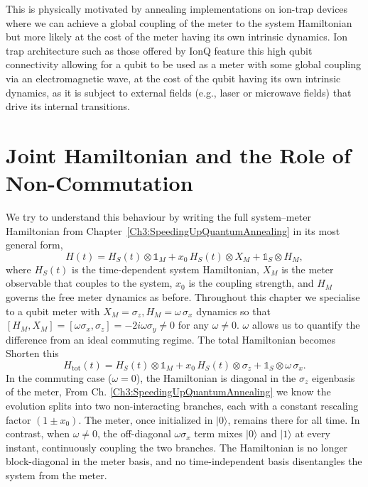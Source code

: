\qquad This is physically motivated by annealing implementations on ion-trap devices where we can achieve a global coupling of the meter to the system Hamiltonian but more likely at the cost of the meter having its own intrinsic dynamics. Ion trap architecture such as those offered by IonQ feature this high qubit connectivity allowing for a qubit to be used as a meter with some global coupling via an electromagnetic wave\cite{IONQArichitecture2019}, at the cost of the qubit having its own intrinsic dynamics, as it is subject to external fields (e.g., laser or microwave fields) that drive its internal transitions.

\section{Joint Hamiltonian and the Role of Non-Commutation}\label{sec:joint_hamiltonian}

\qquad We try to understand this behaviour by writing the full system--meter Hamiltonian from Chapter~\ref{Ch3:SpeedingUpQuantumAnnealing} in its most general form,
\begin{equation}\label{eq:total_hamiltonian_nc}
    H(t) = H_S(t) \otimes \mathds{1}_M + x_0\, H_S(t) \otimes X_M + \mathds{1}_S \otimes H_M,
\end{equation}
where $H_S(t)$ is the time-dependent system Hamiltonian, $X_M$ is the meter observable that couples to the system, $x_0$ is the coupling strength, and $H_M$ governs the free meter dynamics as before. Throughout this chapter we specialise to a qubit meter with $X_M = \sigma_z, H_M = \omega\,\sigma_x$ dynamics so that $[H_M, X_M] = [\omega\sigma_x, \sigma_z] = -2i\omega\sigma_y \neq 0$ for any $\omega \neq 0$. $\omega$ allows us to quantify the difference from an ideal commuting regime. The total Hamiltonian becomes \color{red} Shorten this \color{black}
\begin{equation}\label{eq:total_hamiltonian_explicit}
    H_{\text{tot}}(t) = H_S(t) \otimes \mathds{1}_M + x_0\, H_S(t) \otimes \sigma_z + \mathds{1}_S \otimes \omega\,\sigma_x.
\end{equation}
In the commuting case ($\omega = 0$), the Hamiltonian is diagonal in the $\sigma_z$ eigenbasis of the meter, From Ch. \ref{Ch3:SpeedingUpQuantumAnnealing} we know the evolution splits into two non-interacting branches, each with a constant rescaling factor $(1 \pm x_0)$. The meter, once initialized in $|0\rangle$, remains there for all time. In contrast, when $\omega \neq 0$, the off-diagonal $\omega\sigma_x$ term mixes $|0\rangle$ and $|1\rangle$ at every instant, continuously coupling the two branches. The Hamiltonian is no longer block-diagonal in the meter basis, and no time-independent basis disentangles the system from the meter.

